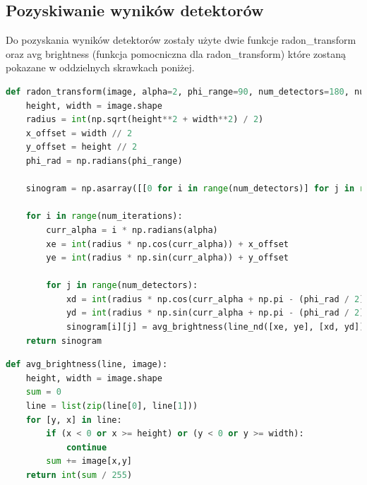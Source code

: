 \documentclass[a4paper,11pt]{article}
\begin{document}
    \subsection{Pozyskiwanie wyników detektorów}
    Do pozyskania wyników detektorów zostały użyte dwie funkcje radon\_transform
    oraz avg brightness (funkcja pomocniczna dla radon\_transform) które zostaną pokazane w oddzielnych skrawkach poniżej.
    \begin{lstlisting}[language=Python, caption=Radon transform, basicstyle=\tiny]
def radon_transform(image, alpha=2, phi_range=90, num_detectors=180, num_iterations=90):
    height, width = image.shape
    radius = int(np.sqrt(height**2 + width**2) / 2)
    x_offset = width // 2
    y_offset = height // 2
    phi_rad = np.radians(phi_range)

    sinogram = np.asarray([[0 for i in range(num_detectors)] for j in range(num_iterations)])

    for i in range(num_iterations):
        curr_alpha = i * np.radians(alpha)
        xe = int(radius * np.cos(curr_alpha)) + x_offset
        ye = int(radius * np.sin(curr_alpha)) + y_offset

        for j in range(num_detectors):
            xd = int(radius * np.cos(curr_alpha + np.pi - (phi_rad / 2) + j * phi_rad/(num_detectors-1))) + x_offset
            yd = int(radius * np.sin(curr_alpha + np.pi - (phi_rad / 2) + j * phi_rad/(num_detectors-1))) + y_offset
            sinogram[i][j] = avg_brightness(line_nd([xe, ye], [xd, yd]), image)
    return sinogram

  \end{lstlisting}

  \begin{lstlisting}[language=Python, caption=Average brightness, basicstyle=\tiny]
def avg_brightness(line, image):
    height, width = image.shape
    sum = 0
    line = list(zip(line[0], line[1]))
    for [y, x] in line:
        if (x < 0 or x >= height) or (y < 0 or y >= width):
            continue
        sum += image[x,y]
    return int(sum / 255)    
  \end{lstlisting}
  
\end{document}
